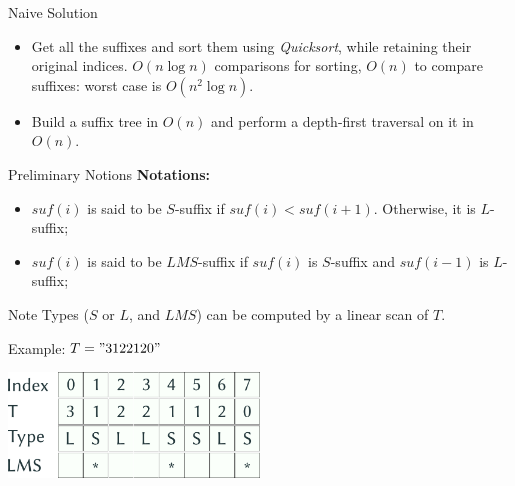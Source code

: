 \documentclass{beamer}
\begin{document}
  \begin{frame}{Naive Solution}
    \begin{itemize}
      \item Get all the suffixes and sort them using \textit{Quicksort}, while retaining their original indices. $O(n\log n)$ comparisons for sorting, $O(n)$ to compare suffixes: worst case is $O(n^2\log n)$.
      \item Build a suffix tree in $O(n)$ and perform a depth-first traversal on it in $O(n)$.    \end{itemize}
  \end{frame}

  \begin{frame}{Preliminary Notions}
    \textbf{Notations:}
    \begin{itemize}
      \item $suf(i)$ is said to be $S$-suffix if $suf(i) < suf(i+1)$. Otherwise, it is $L$-suffix;
      \item $suf(i)$ is said to be $LMS$-suffix if $suf(i)$ is $S$-suffix and $suf(i-1)$ is $L$-suffix;
    \end{itemize}

    \begin{block}{Note}
      \vspace{1pt}
      Types ($S$ or $L$, and $LMS$) can be computed by a linear scan of $T$.
    \end{block}

    \pause

    \begin{block}{Example: $T = "3122120"$}
      \vspace{-5pt}
      \begin{center}
        \includegraphics[width=0.5\textwidth]{img/preliminary.pdf}
      \end{center}
    \end{block}
  \end{frame}
\end{document}
